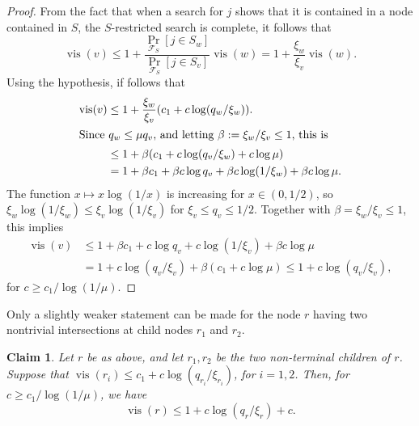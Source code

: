\documentclass[letterpaper,11pt]{article}
\newtheorem{claim}[theorem]{Claim}
\DeclareMathOperator{\vis}{vis}
\newcommand{\cF}{\mathcal{F}}
\begin{document}
\begin{proof}
From the fact that when a 
search for $j$ shows that 
it is contained in a node 
contained in $S$, the 
$S$-restricted search 
is complete, it follows that
\begin{equation}\label{equ:vis-recursion}
  \vis(v) \leq 
    1 + \frac{\Pr_{\cF_S}[j \in S_w]}{\Pr_{\cF_S}[j \in S_v]}\vis(w) 
  = 1 + \frac{\xi_w}{\xi_v}\vis(w).
\end{equation}
Using the hypothesis, if follows that 
\begin{align*}
  \vis(v) &\leq 1 + \frac{\xi_w}{\xi_v}(c_1 + c\log (q_w/\xi_w)).\\
  \intertext{Since $q_w \le \mu q_v$, 
  and letting $\beta := \xi_w / \xi_v \leq 1$,
  this is}
  &\leq  1 + \beta(c_1 + c\log (q_v/\xi_w) + c\log \mu)\\ 
  &=  1 + \beta c_1 + \beta c \log q_v
   + \beta c \log(1/\xi_w) + \beta c \log \mu.
\end{align*}
The function $x \mapsto x\log(1/x)$ 
is increasing for $x \in (0,1/2)$, 
so $\xi_w\log(1/\xi_w)\leq \xi_v\log(1/\xi_v)$ 
for  $\xi_v\leq q_v\leq 1/2$.
Together with $\beta = \xi_w / \xi_v \le 1$, 
this implies
\begin{align*}
\vis(v) &\le  1 + \beta c_1 + c\log q_v 
  + c\log(1/\xi_v) + \beta c \log \mu \\
   &=  1 + c\log (q_v/\xi_v) + \beta(c_1 + c\log \mu ) 
   \leq  1 + c\log (q_v/\xi_v),
\end{align*}
for $c \ge c_1/\log(1/\mu)$.
\end{proof}

Only a slightly weaker statement 
can be made for the node $r$ having two
nontrivial intersections at child 
nodes $r_1$ and $r_2$.

\begin{claim}\label{clm:WR}
  Let $r$ be as above, and 
  let $r_1,r_2$ be the 
  two non-terminal children of
  $r$. Suppose that 
  $\vis(r_i)\le c_1 + 
  c\log (q_{r_i}/\xi_{r_i})$, 
  for $i=1,2$. Then, 
  for $c \ge c_1/\log(1/\mu)$, 
  we have
  \[
    \vis(r) \le 1 + c\log(q_r/\xi_r) + c.
  \]
\end{claim}
\end{document}
